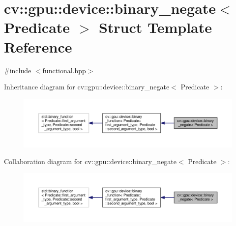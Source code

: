 \hypertarget{structcv_1_1gpu_1_1device_1_1binary__negate}{\section{cv\-:\-:gpu\-:\-:device\-:\-:binary\-\_\-negate$<$ Predicate $>$ Struct Template Reference}
\label{structcv_1_1gpu_1_1device_1_1binary__negate}
}


{\ttfamily \#include $<$functional.\-hpp$>$}



Inheritance diagram for cv\-:\-:gpu\-:\-:device\-:\-:binary\-\_\-negate$<$ Predicate $>$\-:\nopagebreak
\begin{figure}[H]
\begin{center}
\leavevmode
\includegraphics[width=350pt]{structcv_1_1gpu_1_1device_1_1binary__negate__inherit__graph}
\end{center}
\end{figure}


Collaboration diagram for cv\-:\-:gpu\-:\-:device\-:\-:binary\-\_\-negate$<$ Predicate $>$\-:\nopagebreak
\begin{figure}[H]
\begin{center}
\leavevmode
\includegraphics[width=350pt]{structcv_1_1gpu_1_1device_1_1binary__negate__coll__graph}
\end{center}
\end{figure}
